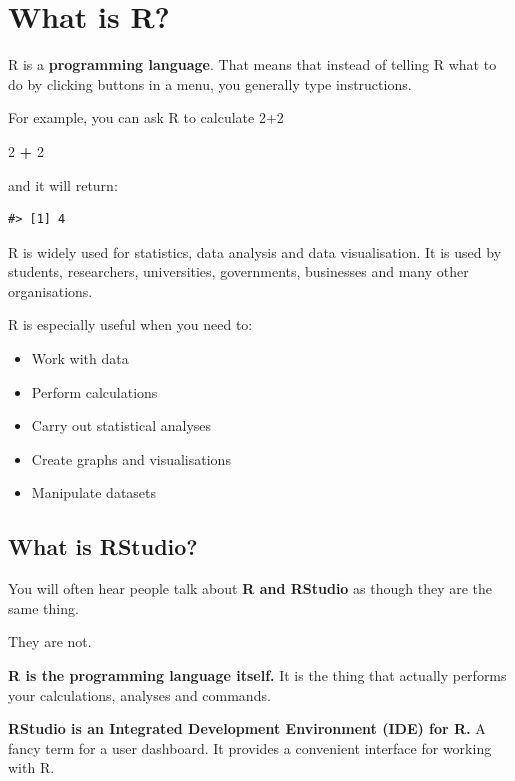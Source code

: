 \documentclass[
]{book}
\newenvironment{Shaded}{\begin{snugshade}}{\end{snugshade}}
\newcommand{\DecValTok}[1]{\textcolor[rgb]{0.00,0.00,0.81}{#1}}
\newcommand{\SpecialCharTok}[1]{\textcolor[rgb]{0.81,0.36,0.00}{\textbf{#1}}}
\providecommand{\tightlist}{%
  \setlength{\itemsep}{0pt}\setlength{\parskip}{0pt}}
\begin{document}
\section{What is R?}\label{what-is-r}

R is a \textbf{programming language}. That means that instead of telling R what to do by clicking buttons in a menu, you generally type instructions.

For example, you can ask R to calculate 2+2

\begin{Shaded}
\begin{Highlighting}[]
\DecValTok{2} \SpecialCharTok{+} \DecValTok{2}
\end{Highlighting}
\end{Shaded}

and it will return:

\begin{verbatim}
#> [1] 4
\end{verbatim}

R is widely used for statistics, data analysis and data visualisation. It is used by students, researchers, universities, governments, businesses and many other organisations.

R is especially useful when you need to:

\begin{itemize}
\tightlist
\item
  Work with data
\item
  Perform calculations
\item
  Carry out statistical analyses
\item
  Create graphs and visualisations
\item
  Manipulate datasets
\end{itemize}

\subsection{What is RStudio?}\label{what-is-rstudio}

You will often hear people talk about \textbf{R and RStudio} as though they are the same thing.

They are not.

\textbf{R is the programming language itself.} It is the thing that actually performs your calculations, analyses and commands.

\textbf{RStudio is an Integrated Development Environment (IDE) for R.} A fancy term for a user dashboard. It provides a convenient interface for working with R.
\end{document}
